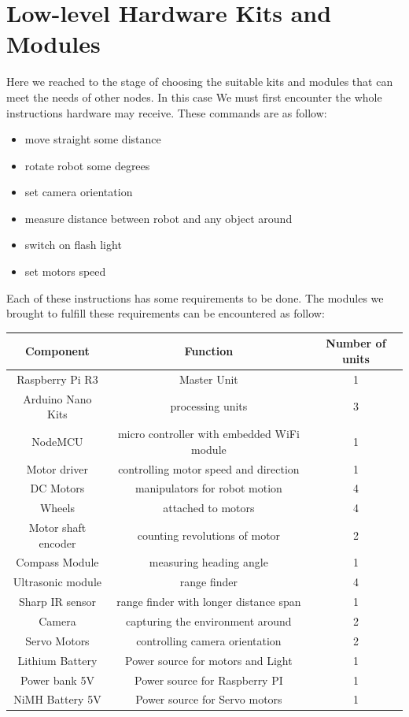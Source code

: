\documentclass[12pt]{book}
\begin{document}
\section{Low-level Hardware Kits and Modules}
Here we reached to the stage of choosing the suitable kits and modules that can meet the needs of other nodes. In this case We must first encounter the whole instructions hardware may receive. These commands are as follow:
\begin{itemize}
	\item move straight some distance
	\item rotate robot some degrees
	\item set camera orientation
	\item measure distance between robot and any object around
	\item switch on flash light
	\item set motors speed
\end{itemize}
Each of these instructions has some requirements to be done. The modules we brought to fulfill these requirements can be encountered as follow:
\begin{center}
	\begin{tabular}{| c | c | c|}
		\hline
		Component & Function & Number of units \\
		\hline
		\hline
		Raspberry Pi R3 & Master Unit & 1\\
		\hline
		Arduino Nano Kits & processing units & 3\\
		\hline
		NodeMCU & micro controller with embedded WiFi module & 1\\
		\hline
		Motor driver & controlling motor speed and direction & 1\\
		\hline
		DC Motors & manipulators for robot motion & 4\\
		\hline
		Wheels & attached to motors & 4\\
		\hline
		Motor shaft encoder & counting revolutions of motor & 2\\
		\hline
		Compass Module & measuring heading angle & 1\\
		\hline
		Ultrasonic module & range finder & 4\\
		\hline
		Sharp IR sensor & range finder with longer distance span & 1\\
		\hline
		Camera & capturing the environment around & 2\\
		\hline
		Servo Motors & controlling camera orientation & 2\\
		\hline
		Lithium Battery & Power source for motors and Light & 1\\
		\hline
		Power bank 5V & Power source for Raspberry PI & 1\\
		\hline
		NiMH Battery 5V & Power source for Servo motors & 1\\
		\hline
	\end{tabular}
\end{center}
\end{document}
